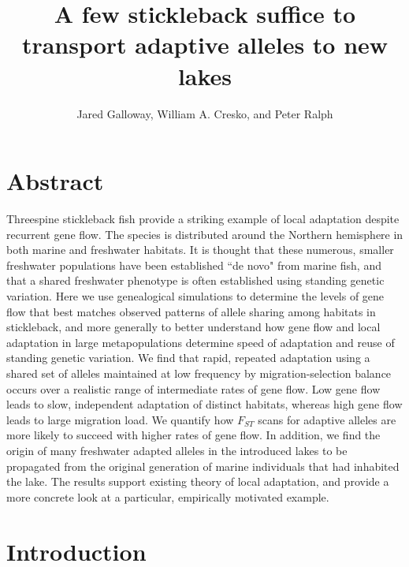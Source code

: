 \documentclass{article}
\newcommand{\plr}[1]{\todo[linecolor=blue,backgroundcolor=blue!25,bordercolor=blue]{#1}}
\begin{document}
\title{A few stickleback suffice to transport adaptive alleles to new lakes}
\author{Jared Galloway, William A. Cresko, and Peter Ralph}
\maketitle


\section*{Abstract}

Threespine stickleback fish provide a striking example of local adaptation despite recurrent gene flow.
The species is distributed around the Northern hemisphere in both marine and freshwater habitats.
It is thought that these numerous, smaller freshwater populations
have been established ``de novo" from marine fish,
and that a shared freshwater phenotype
is often established using standing genetic variation.
Here we use genealogical simulations to determine the levels of gene flow
that best matches observed patterns of allele sharing among habitats in stickleback, 
and more generally to better understand how gene flow and local adaptation in large metapopulations
determine speed of adaptation and reuse of standing genetic variation.
We find that rapid, repeated adaptation using a shared set of alleles maintained at low frequency by migration-selection balance occurs over a realistic range of intermediate rates of gene flow.
Low gene flow leads to slow, independent adaptation of distinct habitats, whereas high gene flow leads to large migration load.
We quantify how $F_{ST}$ scans for adaptive alleles are more likely to succeed with higher rates of gene flow.
In addition, we find the origin of many freshwater adapted alleles in the introduced lakes to be propagated from the original generation of marine individuals that had inhabited the lake.
The results support existing theory of local adaptation, and provide a more concrete look at a particular, empirically motivated example.  

\section*{Introduction}

%
\end{document}
